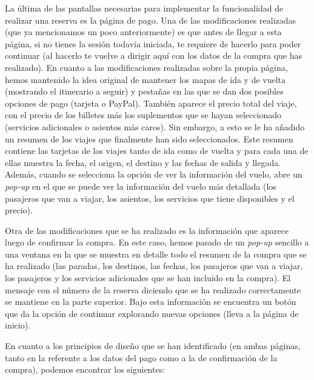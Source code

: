La última de las pantallas necesarias para implementar la funcionalidad de realizar una reserva es la página de
pago. Una de las modificaciones realizadas (que ya mencionamos un poco anteriormente) es que antes de llegar a
esta página, si no tienes la sesión todavía iniciada, te requiere de hacerlo para poder continuar (al hacerlo te
vuelve a dirigir aquí con los datos de la compra que has realizado). En cuanto a las modificaciones realizadas
sobre la propia página, hemos mantenido la idea original de mantener los mapas de ida y de vuelta (mostrando el
itinerario a seguir) y pestañas en las que se dan dos posibles opciones de pago (tarjeta o PayPal). También
aparece el precio total del viaje, con el precio de los billetes más los suplementos que se hayan seleccionado
(servicios adicionales o asientos más caros). Sin embargo, a esto se le ha añadido un resumen de los viajes que
finalmente han sido seleccionados. Este resumen contiene las tarjetas de los viajes tanto de ida como de vuelta
y para cada una de ellas muestra la fecha, el origen, el destino y las fechas de salida y llegada. Además, cuando
se selecciona la opción de ver la información del vuelo, abre un \textit{pop-up} en el que se puede ver la información del
vuelo más detallada (los pasajeros que van a viajar, los asientos, los servicios que tiene disponibles y el precio). 

Otra de las modificaciones que se ha realizado es la información que aparece luego de confirmar la compra. En este
caso, hemos pasado de un \textit{pop-up} sencillo a una ventana en la que se muestra en detalle todo el resumen de la compra
que se ha realizado (las paradas, los destinos, las fechas, los pasajeros que van a viajar, los pasajeros y los
servicios adicionales que se han incluido en la compra). El mensaje con el número de la reserva diciendo que se ha
realizado correctamente se mantiene en la parte superior. Bajo esta información se encuentra un botón que da la
opción de continuar explorando nuevas opciones (lleva a la página de inicio). 

En cuanto a los principios de diseño que se han identificado (en ambas páginas, tanto en la referente a los datos
del pago como a la de confirmación de la compra), podemos encontrar los siguientes:

